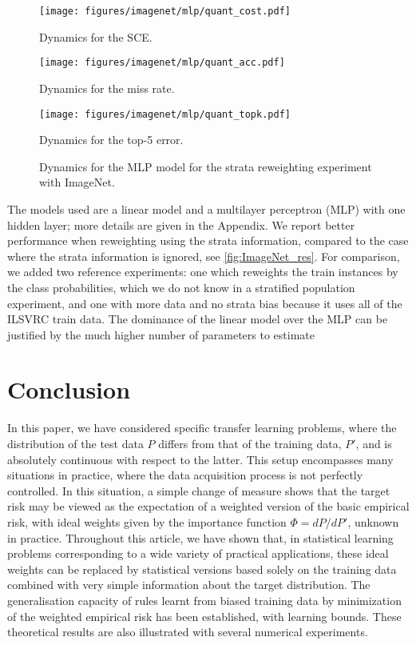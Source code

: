 \documentclass[12pt]{article}
\begin{document}
\begin{figure}[!htb]


    \texttt{[image: figures/imagenet/mlp/quant\_cost.pdf]}
\caption*{Dynamics for the SCE.}\label{fig:imgnetmlp_quant_cost}
\endminipage
\hfill
{}


    \texttt{[image: figures/imagenet/mlp/quant\_acc.pdf]}
\caption*{Dynamics for the miss rate.}\label{fig:imgnetmlp_quant_acc}
\endminipage
\hfill
{}


    \texttt{[image: figures/imagenet/mlp/quant\_topk.pdf]}
\caption*{Dynamics for the top-5 error.}\label{fig:imgnetmlp_quant_topk}
\endminipage

\caption{Dynamics for the MLP model for the strata reweighting experiment with ImageNet.}\label{fig:ImageNet_mlp_dynamics}
\end{figure}

The models used are a linear model and a multilayer perceptron (MLP) with one
hidden layer; more details are given in the Appendix. We report
better performance when reweighting using the strata information, compared to
the case where the strata information is ignored, see \cref{fig:ImageNet_res}.
For comparison, we added two reference experiments: one which reweights the
train instances by the class probabilities, which we do not know in a
stratified population experiment, and one with more data and no strata bias
because it uses all of the ILSVRC train data. The dominance of the linear
model over the MLP can be justified by the much higher number of parameters
to estimate  
\section{Conclusion}\label{sec:conclusion}
In this paper, we have considered specific transfer learning problems, where
the distribution of the test data $P$ differs from that of the training data,
$P'$, and is absolutely continuous with respect to the latter. This setup
encompasses many situations in practice, where the data acquisition process is
not perfectly controlled. In this situation, a simple change of measure shows
that the target risk may be viewed as the expectation of a weighted version of
the basic empirical risk, with ideal weights given by the importance function
$\Phi=dP/dP'$, unknown in practice. Throughout this article, we have shown that,
in statistical learning problems corresponding to a wide variety of practical
applications, these ideal weights can be replaced by statistical versions based
solely on the training data combined with very simple information about the
target distribution. 
The generalisation capacity of rules learnt from biased training data by
minimization of the weighted empirical risk has been established, 
with learning bounds.
These theoretical results are also illustrated with
several numerical experiments.
 
\end{document}
